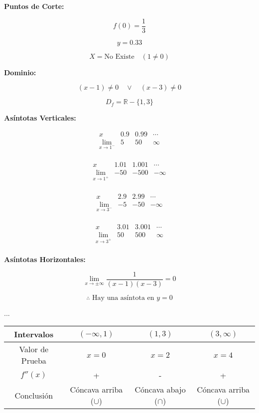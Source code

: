 \textbf{Puntos de Corte:}

\[
f(0) = \frac{1}{3}
\]

\[
y = 0.33
\]

\[
X = \text{No Existe} \quad (1 \neq 0)
\]

\textbf{Dominio:}

\[
(x-1) \neq 0 \quad \vee \quad (x-3) \neq 0
\]

\[
D_f = \mathbb{R} - \{1,3\}
\]

\textbf{Asíntotas Verticales:}

\[
\begin{array}{c|c|c|c}
x & 0.9 & 0.99 & \cdots \\
\hline
\lim_{x \to 1^-} & 5 & 50 & \infty \\
\end{array}
\]

\[
\begin{array}{c|c|c|c}
x & 1.01 & 1.001 & \cdots \\
\hline
\lim_{x \to 1^+} & -50 & -500 & -\infty \\
\end{array}
\]

\[
\begin{array}{c|c|c|c}
x & 2.9 & 2.99 & \cdots \\
\hline
\lim_{x \to 3^-} & -5 & -50 & -\infty \\
\end{array}
\]

\[
\begin{array}{c|c|c|c}
x & 3.01 & 3.001 & \cdots \\
\hline
\lim_{x \to 3^+} & 50 & 500 & \infty \\
\end{array}
\]



\textbf{Asíntotas Horizontales:}

\[
\lim_{x \to \pm\infty} \frac{1}{(x-1)(x-3)} = 0
\]

\[
\therefore \text{ Hay una asíntota en } y = 0
\]


...

\begin{center}
    \begin{tabular}{|c|c|c|c|}
        \hline
        Intervalos & $(-\infty,1)$ & $(1,3)$ & $(3,\infty)$ \\
        \hline
        Valor de Prueba & $x=0$ & $x=2$ & $x=4$ \\
        \hline
        $f''(x)$ & + & - & + \\
        \hline
        Conclusión & Cóncava arriba ($\cup$) & Cóncava abajo ($\cap$) & Cóncava arriba ($\cup$) \\
        \hline
    \end{tabular}
\end{center}


